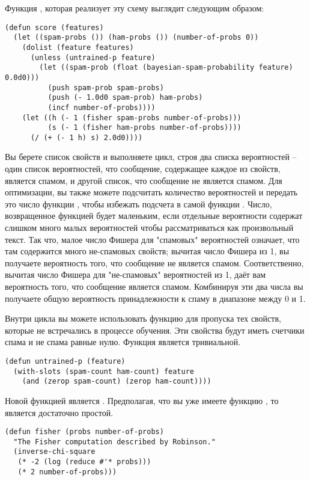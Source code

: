 Функция , которая реализует эту схему выглядит следующим образом:

\begin{lstlisting}
(defun score (features)
  (let ((spam-probs ()) (ham-probs ()) (number-of-probs 0))
    (dolist (feature features)
      (unless (untrained-p feature)
        (let ((spam-prob (float (bayesian-spam-probability feature) 0.0d0)))
          (push spam-prob spam-probs)
          (push (- 1.0d0 spam-prob) ham-probs)
          (incf number-of-probs))))
    (let ((h (- 1 (fisher spam-probs number-of-probs)))
          (s (- 1 (fisher ham-probs number-of-probs))))
      (/ (+ (- 1 h) s) 2.0d0))))
\end{lstlisting}

Вы берете список свойств и выполняете цикл, строя два списка вероятностей -- один список
вероятностей, что сообщение, содержащее каждое из свойств, является спамом, и другой
список, что сообщение не является спамом.  Для оптимизации, вы также можете подсчитать
количество вероятностей и передать это число функции , чтобы избежать
подсчета в самой функции .  Число, возвращенное функцией  будет
маленьким, если отдельные вероятности содержат слишком много малых вероятностей чтобы
рассматриваться как произвольный текст.  Так что, малое число Фишера для "спамовых"
вероятностей означает, что там содержится много не-спамовых свойств; вычитая число Фишера
из 1, вы получаете вероятность того, что сообщение не является спамом.  Соответственно,
вычитая число Фишера для "не-спамовых" вероятностей из 1, даёт вам вероятность того, что
сообщение является спамом.  Комбинируя эти два числа вы получаете общую вероятность
принадлежности к спаму в диапазоне между 0 и 1.

Внутри цикла вы можете использовать функцию  для пропуска тех свойств,
которые не встречались в процессе обучения.  Эти свойства будут иметь счетчики спама и не
спама равные нулю.  Функция  является тривиальной.

\begin{lstlisting}
(defun untrained-p (feature)
  (with-slots (spam-count ham-count) feature
    (and (zerop spam-count) (zerop ham-count))))
\end{lstlisting}

Новой функцией является .  Предполагая, что вы уже имеете функцию
, то  является достаточно простой.

\begin{lstlisting}
(defun fisher (probs number-of-probs)
  "The Fisher computation described by Robinson."
  (inverse-chi-square 
   (* -2 (log (reduce #'* probs)))
   (* 2 number-of-probs)))
\end{lstlisting}

